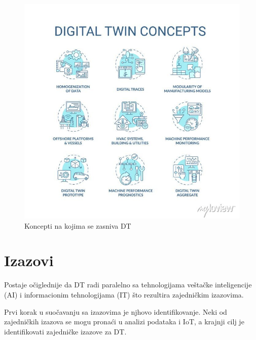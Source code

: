 \documentclass[a4paper]{article}
\begin{document}
{\begin{figure}[h!]
	\begin{center}
		\includegraphics[scale=0.33]{5_concept.jpg}
	\end{center}
	\caption{Koncepti na kojima se zasniva DT\cite{sticker}}
\end{figure}

\section{Izazovi}
\label{izazovi}

Postaje očiglednije da DT radi paralelno sa tehnologijama veštačke inteligencije (AI) i
informacionim tehnologijama (IT) što rezultira zajedničkim izazovima.

Prvi korak u suočavanju sa izazovima je njhovo identifikovanje. Neki od zajedničkih izazova se
mogu pronaći u analizi podataka i IoT, a krajnji cilj je identifikovati zajedničke izazove za
DT. \cite{enablingtechnologies}

}
\end{document}
